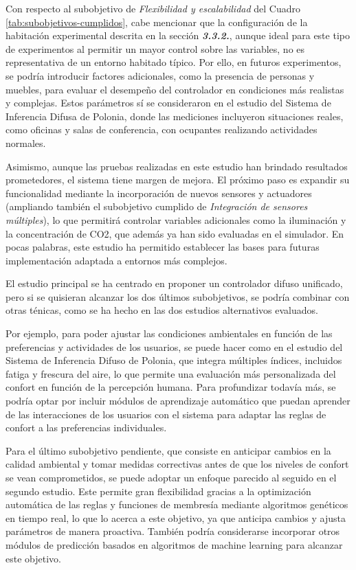Con respecto al subobjetivo de \textit{Flexibilidad y escalabilidad} del Cuadro \ref{tab:subobjetivos-cumplidos}, cabe mencionar que la configuración de la habitación experimental descrita en la sección \textbf{\textit{3.3.2.}}, aunque ideal para este tipo de experimentos al permitir un mayor control sobre las variables, no es representativa de un entorno habitado típico. Por ello, en futuros experimentos, se podría introducir factores adicionales, como la presencia de personas y muebles, para evaluar el desempeño del controlador en condiciones más realistas y complejas. Estos parámetros sí se consideraron en el estudio del Sistema de Inferencia Difusa de Polonia, donde las mediciones incluyeron situaciones reales, como oficinas y salas de conferencia, con ocupantes realizando actividades normales.

Asimismo, aunque las pruebas realizadas en este estudio han brindado resultados prometedores, el sistema tiene margen de mejora. El próximo paso es expandir su funcionalidad mediante la incorporación de nuevos sensores y actuadores (ampliando también el subobjetivo cumplido de \textit{Integración de sensores múltiples}), lo que permitirá controlar variables adicionales como la iluminación y la concentración de CO2, que además ya han sido evaluadas en el simulador. En pocas palabras, este estudio ha permitido establecer las bases para futuras implementación adaptada a entornos más complejos.

El estudio principal se ha centrado en proponer un controlador difuso unificado, pero si se quisieran alcanzar los dos últimos subobjetivos, se podría combinar con otras ténicas, como se ha hecho en las dos estudios alternativos evaluados.

Por ejemplo, para poder ajustar las condiciones ambientales en función de las preferencias y actividades de los usuarios, se puede hacer como en el estudio del Sistema de Inferencia Difuso de Polonia, que integra múltiples índices, incluidos fatiga y frescura del aire, lo que permite una evaluación más personalizada del confort en función de la percepción humana. Para profundizar todavía más, se podría optar por incluir módulos de aprendizaje automático que puedan aprender de las interacciones de los usuarios con el sistema para adaptar las reglas de confort a las preferencias individuales.

Para el último subobjetivo pendiente, que consiste en anticipar cambios en la calidad ambiental y tomar medidas correctivas antes de que los niveles de confort se vean comprometidos, se puede adoptar un enfoque parecido al seguido en el segundo estudio. Este permite gran flexibilidad gracias a la optimización automática de las reglas y funciones de membresía mediante algoritmos genéticos en tiempo real, lo que lo acerca a este objetivo, ya que anticipa cambios y ajusta parámetros de manera proactiva. También podría considerarse incorporar otros módulos de predicción basados en algoritmos de machine learning para alcanzar este objetivo.

